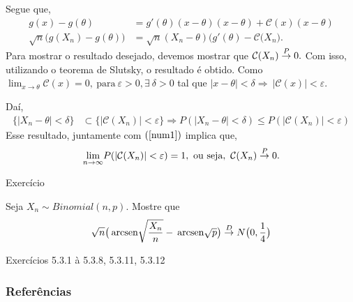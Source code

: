 \documentclass[12pt]{beamer}
\begin{document}
\begin{frame}{}
\begin{block}{}
\justifying
Segue que, 
\begin{align*}
g(x)-g(\theta)&=g'(\theta)(x-\theta)(x-\theta)+\mathcal{C}(x)(x-\theta)\\
\sqrt{n}\big(g(X_{n})-g(\theta)\big)&=\sqrt{n}(X_{n}-\theta)\big(g'(\theta)-\mathcal{C}(X_{n}\big).
\end{align*}
Para mostrar o resultado desejado, devemos mostrar que $\mathcal{C}(X_{n})\overset{P}{\rightarrow} 0.$ Com isso, utilizando o teorema de Slutsky, o resultado é obtido. Como ${\displaystyle \lim_{x\rightarrow \theta} \mathcal{C}(x)=0},~\text{para}~\varepsilon>0, \exists~\delta>0$ tal que $|x-\theta|<\delta\Rightarrow~|\mathcal{C}(x)|<\varepsilon.$
\end{block}
\pause
\begin{block}{}
\justifying
Daí,
\begin{align*}
    \{|X_{n}-\theta|<\delta\}&\subset \{|\mathcal{C}(X_{n})|<\varepsilon\}\Rightarrow P(|X_{n}-\theta|<\delta)\leq P(|\mathcal{C}(X_{n})|<\varepsilon)
\end{align*}
Esse resultado, juntamente com $(\ref{num1})$ implica que,
\begin{align*}
    {\displaystyle \lim_{n\to\infty}} P(|\mathcal{C}(X_{n})|<\varepsilon)=1,~\text{ou seja},~\mathcal{C}(X_{n})\overset{P}{\rightarrow} 0.
\end{align*}
\end{block}
\end{frame}

\begin{frame}{Exercício}
\begin{block}{\Home}
\justifying
Seja $X_{n}\sim Binomial(n,p).$ Mostre que 
\begin{align*}
    \sqrt{n}\big(\hspace{2pt}\textrm{arcsen}{\sqrt{\dfrac{X_{n}}{n}}}-\hspace{2pt}\textrm{arcsen}{\sqrt{p}}\big)\overset{D}{\rightarrow} N\big(0,\dfrac{1}{4}\big)
\end{align*}
\end{block}
\nocite{casella2021statistical} \nocite{hogg}
\end{frame}

\begin{frame}{}
\begin{block}{\Home}
\justifying
Exercícios 5.3.1 à 5.3.8, 5.3.11, 5.3.12
\end{block}
\end{frame}


\begin{frame}[allowframebreaks]
\frametitle{\bf Referências}
\printbibliography
\end{frame}
\end{document}
